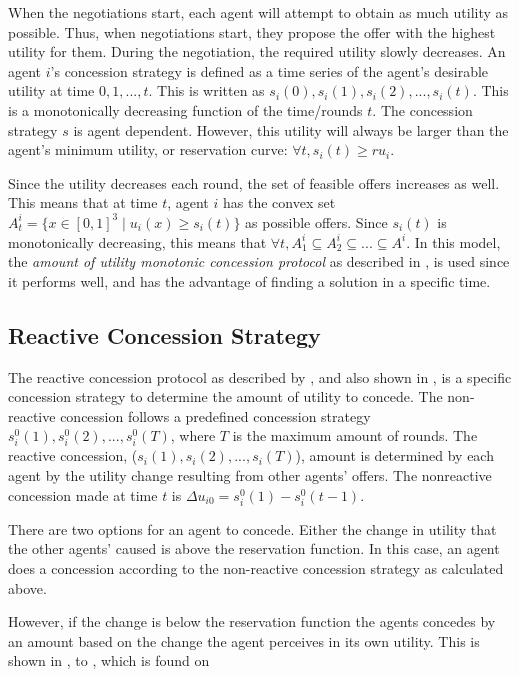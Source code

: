 When the negotiations start, each agent will attempt to obtain as much utility as possible. Thus, when negotiations start, they propose the offer with the highest utility for them. During the negotiation, the required utility slowly decreases. An agent $i$'s concession strategy is defined as a time series of the agent's desirable utility at time $0,1,...,t$. This is written as $s_i(0), s_i(1), s_i(2),..., s_i(t)$.  This is a monotonically decreasing function of the time/rounds $t$. The concession strategy $s$ is agent dependent. However, this utility will always be larger than the agent's minimum utility, or reservation curve: $ \forall t, s_i(t) \geq ru_i$.

Since the utility decreases each round, the set of feasible offers increases as well. This means that at time $t$, agent $i$ has the convex set $A^i_t = \{x\in [0,1]^3 \mid u_i(x) \geq s_i(t)   \}$ as possible offers. Since $s_i(t)$ is monotonically decreasing, this means that $\forall t, A^i_1\subseteq A^i_2 \subseteq ... \subseteq A^i$. In this model, the \textit{amount of utility monotonic concession protocol} as described in , is used since it performs well, and has the advantage of finding a solution in a specific time.

\subsection{Reactive Concession Strategy}
\label{sec:reactiveconcessionstr}
The reactive concession protocol as described by \citet{zheng2015automated}, and also shown in , is a specific concession strategy to determine the amount of utility to concede. The non-reactive concession follows a predefined concession strategy $s_i^0(1), s_i^0(2),...,s_i^0(T)$, where $T$ is the maximum amount of rounds. The reactive concession, ($s_i(1), s_i(2),..., s_i(T)$), amount is determined by each agent by the utility change resulting from other agents' offers. The nonreactive concession made at time $t$ is $\Delta u_{i0} = s^0_i(1)-s^0_i(t-1)$.

There are two options for an agent to concede. Either the change in utility that the other agents' caused is above the reservation function. In this case, an agent does a concession according to the non-reactive concession strategy as calculated above. 


 However, if the change is below the reservation function the agents concedes by an amount based on the change the agent perceives in its own utility. This is shown in ,   to , which is found on 
 
